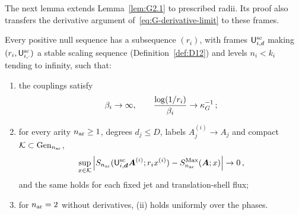The next lemma extends Lemma~\ref{lem:G2.1} to prescribed radii. Its proof also transfers the derivative argument of~\eqref{eq:G-derivative-limit} to these frames.
\begin{lemma}\label{lem:I-radii}
Every positive null sequence has a subsequence $(r_i)$, with frames $\mathsf{U}_{i,d}^{\mathrm{sc}}$ making $(r_i,\mathsf{U}_{i,\cdot}^{\mathrm{sc}})$ a stable scaling sequence (Definition~\ref{def:D12}) and levels $n_i<k_i$ tending to infinity, such that:
\begin{enumerate}[label=(\roman*)]
\item the couplings satisfy
\begin{equation}\label{eq:I-adjustable}
\beta_i\to\infty,\qquad \frac{\log(1/r_i)}{\beta_i}\to\kappa_G^{-1}\,;
\end{equation}
\item for every arity $n_{\rm ar}\ge1$, degrees $d_j\le D$, labels $A_j^{(i)}\to A_j$ and compact $\mathcal K\subset\mathrm{Gen}_{n_{\rm ar}}$,
\begin{equation*}
\sup_{x\in \mathcal K}\left|S_{n_{\rm ar}}(\mathsf{U}_{i,\boldsymbol d}^{\mathrm{sc}}\boldsymbol A^{(i)};r_ix^{(i)})-S^{\mathrm{Max}}_{n_{\rm ar}}(\boldsymbol A;x)\right|\to0\,,
\end{equation*}
and the same holds for each fixed jet and translation-shell flux;
\item for $n_{\rm ar}=2$ without derivatives, (ii) holds uniformly over the phases.
\end{enumerate}
\end{lemma}
